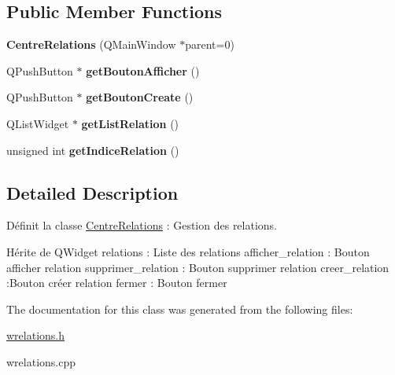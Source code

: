 \subsection*{Public Member Functions}
\begin{DoxyCompactItemize}
\item 
\mbox{\label{class_centre_relations_ad0acb1b924d26acd8d360822e79d1934}} 
{\bfseries Centre\+Relations} (Q\+Main\+Window $\ast$parent=0)
\item 
\mbox{\label{class_centre_relations_a479c99cac3973e895162ee046d1dc384}} 
Q\+Push\+Button $\ast$ {\bfseries get\+Bouton\+Afficher} ()
\item 
\mbox{\label{class_centre_relations_af2e962e488c16f392cd0c5b567248d1a}} 
Q\+Push\+Button $\ast$ {\bfseries get\+Bouton\+Create} ()
\item 
\mbox{\label{class_centre_relations_a6e4fca74ff6dfa469544172670d09039}} 
Q\+List\+Widget $\ast$ {\bfseries get\+List\+Relation} ()
\item 
\mbox{\label{class_centre_relations_aaa277d81494895db654348e2da8acb92}} 
unsigned int {\bfseries get\+Indice\+Relation} ()
\end{DoxyCompactItemize}


\subsection{Detailed Description}
Définit la classe \hyperlink{class_centre_relations}{Centre\+Relations} \+: Gestion des relations. 

Hérite de Q\+Widget relations \+: Liste des relations afficher\+\_\+relation \+: Bouton afficher relation supprimer\+\_\+relation \+: Bouton supprimer relation creer\+\_\+relation \+:Bouton créer relation fermer \+: Bouton fermer 

The documentation for this class was generated from the following files\+:\begin{DoxyCompactItemize}
\item 
\hyperlink{wrelations_8h}{wrelations.\+h}\item 
wrelations.\+cpp\end{DoxyCompactItemize}
